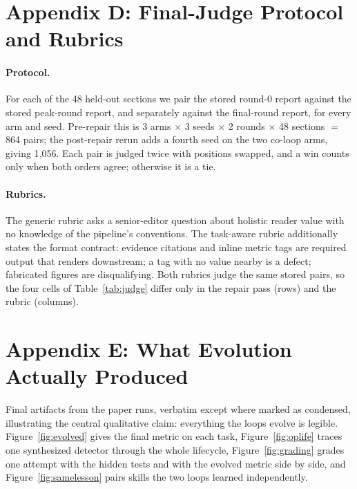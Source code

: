 \documentclass[letterpaper]{article} %
\begin{document}
\section{Appendix D: Final-Judge Protocol and Rubrics}
\label{app:judge}

\paragraph{Protocol.} For each of the 48 held-out sections we pair the stored round-0 report against the stored peak-round report, and separately against the final-round report, for every arm and seed. Pre-repair this is 3 arms $\times$ 3 seeds $\times$ 2 rounds $\times$ 48 sections $=$ 864 pairs; the post-repair rerun adds a fourth seed on the two co-loop arms, giving 1{,}056. Each pair is judged twice with positions swapped, and a win counts only when both orders agree; otherwise it is a tie.

\paragraph{Rubrics.} The generic rubric asks a senior-editor question about holistic reader value with no knowledge of the pipeline's conventions. The task-aware rubric additionally states the format contract: evidence citations and inline metric tags are required output that renders downstream; a tag with no value nearby is a defect; fabricated figures are disqualifying. Both rubrics judge the same stored pairs, so the four cells of Table~\ref{tab:judge} differ only in the repair pass (rows) and the rubric (columns).

\section{Appendix E: What Evolution Actually Produced}
\label{app:artifacts}

Final artifacts from the paper runs, verbatim except where marked as condensed, illustrating the central qualitative claim: everything the loops evolve is legible. Figure~\ref{fig:evolved} gives the final metric on each task, Figure~\ref{fig:oplife} traces one synthesized detector through the whole lifecycle, Figure~\ref{fig:grading} grades one attempt with the hidden tests and with the evolved metric side by side, and Figure~\ref{fig:samelesson} pairs skills the two loops learned independently.
\end{document}
